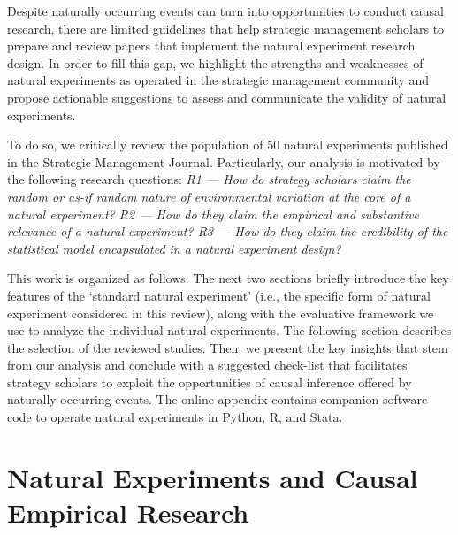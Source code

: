 \documentclass[nobib]{tufte-handout}
\begin{document}
\begin{refsection}
Despite naturally occurring events can turn into opportunities to conduct causal
research, there are limited guidelines that help strategic management
scholars to prepare and review papers that implement the natural
experiment research design. In order to fill this gap, we highlight the 
strengths and weaknesses of natural experiments as operated in the strategic 
management community and propose actionable suggestions to assess and communicate
the validity of natural experiments.

To do so, we critically review the population of 50 natural experiments
published in the Strategic Management Journal. Particularly, our analysis is
motivated by the following research questions: \emph{R1 --- How do strategy
    scholars claim the random or as-if random nature of environmental variation
    at the core of a natural experiment? R2 --- How do they claim the empirical
    and substantive relevance of a natural experiment? R3 --- How do they claim
    the credibility of the statistical model encapsulated in a natural
experiment design?}




This work is organized as follows. The next two sections briefly introduce the key
features of the `standard natural experiment' (i.e., the specific form of
natural experiment considered in this review), along with the evaluative
framework we use to analyze the individual natural experiments. The following
section describes the selection of the reviewed studies. Then, we present the
key insights that stem from our analysis and conclude with a suggested
check-list that facilitates strategy scholars to exploit the opportunities of
causal inference offered by naturally occurring events. The online appendix
contains companion software code to operate natural experiments in Python, R,
and Stata.

\section{Natural Experiments and Causal Empirical Research}
\label{sec:standard_ne}


\end{refsection}
\end{document}
